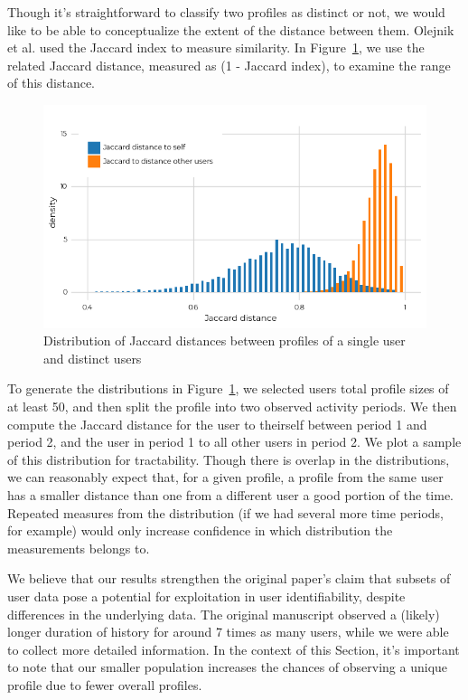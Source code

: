 \documentclass[letterpaper,twocolumn,10pt]{article}
\begin{document}
Though it's straightforward to classify two profiles as distinct or not, we would like to be able to conceptualize the extent of the distance between them. Olejnik et al. used the Jaccard index to measure similarity. 
In Figure~\ref{fig:jaccard_to_self}, we use the related Jaccard distance, measured as (1 - Jaccard index), to examine the range of this distance.
%
\begin{figure}[!ht]
    \centering
    \includegraphics[width=0.9\linewidth]{figures/4-h-jaccard-to-self-1.png}
    \caption{Distribution of Jaccard distances between profiles of a single user and distinct users}
    \label{fig:jaccard_to_self}
\end{figure}
To generate the distributions in Figure~\ref{fig:jaccard_to_self}, we selected users total profile sizes of at least 50, and then split the profile into two observed activity periods. 
We then compute the Jaccard distance for the user to theirself between period 1 and period 2, and the user in period 1 to all other users in period 2.
We plot a sample of this distribution for tractability. 
Though there is overlap in the distributions, we can reasonably expect that, for a given profile, a profile from the same user has a smaller distance than one from a different user a good portion of the time. 
Repeated measures from the distribution (if we had several more time periods, for example) would only increase confidence in which distribution the measurements belongs to.

We believe that our results strengthen the original paper's claim that subsets of user data pose a potential for exploitation in user identifiability, despite differences in the underlying data.
The original manuscript observed a (likely) longer duration of history for around 7 times as many users, while we were able to collect more detailed information.
In the context of this Section, it's important to note that our smaller population increases the chances of observing a unique profile due to fewer overall profiles. 
\end{document}
